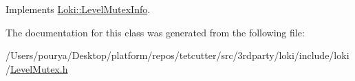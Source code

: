 Implements \hyperlink{classLoki_1_1LevelMutexInfo_a01c9af5cb0f6870585b864b4557e9242}{Loki\+::\+Level\+Mutex\+Info}.



The documentation for this class was generated from the following file\+:\begin{DoxyCompactItemize}
\item 
/\+Users/pourya/\+Desktop/platform/repos/tetcutter/src/3rdparty/loki/include/loki/\hyperlink{LevelMutex_8h}{Level\+Mutex.\+h}\end{DoxyCompactItemize}

